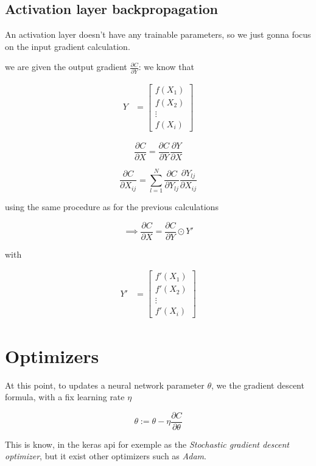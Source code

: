 \documentclass[a4paper, twocolumn, twoside]{article}
\begin{document}
	\subsection{Activation layer backpropagation}

	An activation layer doesn't have any trainable parameters, so we just gonna focus on the input gradient calculation.

	we are given
	the output gradient $\frac{\partial C}{\partial Y}$:
	we know that 

	\begin{align*}
		Y &= \begin{bmatrix}
		f(X_1) \\
		f(X_2) \\
        \vdots \\
		f(X_i)
	\end{bmatrix}
	\end{align*}

	$$
    \frac{\partial C}{\partial X} = \frac{\partial C}{\partial Y} \frac{\partial Y}{\partial X}
	$$

	$$
    \frac{\partial C}{\partial X_{ij}} = \sum_{l=1}^{N} \frac{\partial C}{\partial Y_{lj}} \frac{\partial Y_{lj}}{\partial X_{ij}}
	$$

	using the same procedure as for the previous calculations

	$$
	\implies \frac{\partial C}{\partial X} = \frac{\partial C}{\partial Y} \odot Y\prime
	$$

	with 

	\begin{align*}
		Y\prime &= \begin{bmatrix}
		f\prime(X_1) \\
		f\prime(X_2) \\
        \vdots \\
		f\prime(X_i)
	\end{bmatrix}
	\end{align*}

	\section{Optimizers}
	
	At this point, to updates a neural network parameter $\theta$, we the gradient descent formula,
	with a fix learning rate $\eta$

	$$
	\theta := \theta - \eta \frac{\partial C}{\partial \theta}
	$$

	This is know, in the keras api for exemple as the \textit{Stochastic gradient descent optimizer},
	but it exist other optimizers such as \textit{Adam}.
\end{document}
